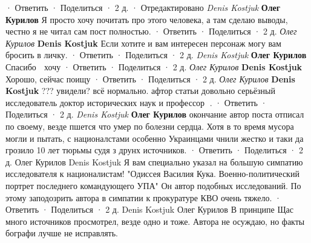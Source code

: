 \begin{itemize}
\begin{itemize}
\begin{itemize}
 · Ответить · Поделиться · 2 д. · Отредактировано
\emph{Denis Kostjuk}
\textbf{Олег Курилов} Я просто хочу почитать про этого человека, а там сделаю выводы, честно я не читал сам пост полностью.
 · Ответить · Поделиться · 2 д.
\emph{Олег Курилов}
\textbf{Denis Kostjuk} Если хотите и вам интересен персонаж могу вам бросить в личку.
 · Ответить · Поделиться · 2 д.
\emph{Denis Kostjuk}
\textbf{Олег Курилов} Спасибо 🙂 хочу
 · Ответить · Поделиться · 2 д.
\emph{Олег Курилов}
\textbf{Denis Kostjuk} Хорошо, сейчас поищу
 · Ответить · Поделиться · 2 д.
\emph{Олег Курилов}
\textbf{Denis Kostjuk} ??? увидели? всё нормально. афтор статьи довольно серьёзный исследователь доктор исторических наук и профессор 🙂.
 · Ответить · Поделиться · 2 д.
\emph{Denis Kostjuk}
\textbf{Олег Курилов} окончание автор поста отписал по своему, везде пшется что умер по болезни сердца. Хотя в то время мусора могли и пытать, с националстами особенно Украинцами чнили жестко и таки да грозило 10 лет тюрьмы судя з друнх источников.
 · Ответить · Поделиться · 2 д.
Олег Курилов
Denis Kostjuk Я вам специально указал на большую симпатию исследователя к националистам! "Одиссея Василия Кука. Военно-политический портрет последнего командующего УПА" Он автор подобных исследований. По этому заподозрить автора в симпатии к прокуратуре КВО очень тяжело.
 · Ответить · Поделиться · 2 д.
Denis Kostjuk
Олег Курилов В принципе Щас много источников просмотрел, везде одно и тоже. Автора не осуждаю, но факты бографи лучше не исправлять.
\end{itemize} %

\end{itemize} %

\end{itemize} %

